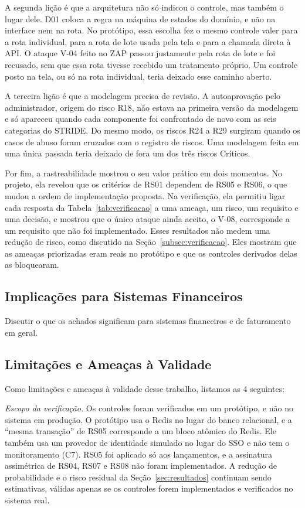 \documentclass[conference]{IEEEtran}
\begin{document}
A segunda lição é que a arquitetura não só indicou o controle, mas também o lugar dele. D01 coloca a regra na máquina de estados do domínio, e não na interface nem na rota. No protótipo, essa escolha fez o mesmo controle valer para a rota individual, para a rota de lote usada pela tela e para a chamada direta à API. O ataque V-04 feito no ZAP passou justamente pela rota de lote e foi recusado, sem que essa rota tivesse recebido um tratamento próprio. Um controle posto na tela, ou só na rota individual, teria deixado esse caminho aberto.

A terceira lição é que a modelagem precisa de revisão. A autoaprovação pelo administrador, origem do risco R18, não estava na primeira versão da modelagem e só apareceu quando cada componente foi confrontado de novo com as seis categorias do STRIDE. Do mesmo modo, os riscos R24 a R29 surgiram quando os casos de abuso foram cruzados com o registro de riscos. Uma modelagem feita em uma única passada teria deixado de fora um dos três riscos Críticos.

Por fim, a rastreabilidade mostrou o seu valor prático em dois momentos. No projeto, ela revelou que os critérios de RS01 dependem de RS05 e RS06, o que mudou a ordem de implementação proposta. Na verificação, ela permitiu ligar cada resposta da Tabela~\ref{tab:verificacao} a uma ameaça, um risco, um requisito e uma decisão, e mostrou que o único ataque ainda aceito, o V-08, corresponde a um requisito que não foi implementado. Esses resultados não medem uma redução de risco, como discutido na Seção~\ref{subsec:verificacao}. Eles mostram que as ameaças priorizadas eram reais no protótipo e que os controles derivados delas as bloquearam.

\subsection{Implicações para Sistemas Financeiros}
Discutir o que os achados significam para sistemas financeiros e de faturamento em geral.

\subsection{Limitações e Ameaças à Validade}
\label{subsec:limitacoes}

Como limitações e ameaças à validade desse trabalho, listamos as 4 seguintes:

\emph{Escopo da verificação.} Os controles foram verificados em um protótipo, e não no sistema em produção. O protótipo usa o Redis no lugar do banco relacional, e a ``mesma transação'' de RS05 corresponde a um bloco atômico do Redis. Ele também usa um provedor de identidade simulado no lugar do SSO e não tem o monitoramento (C7). RS05 foi aplicado só aos lançamentos, e a assinatura assimétrica de RS04, RS07 e RS08 não foram implementados. A redução de probabilidade e o risco residual da Seção~\ref{sec:resultados} continuam sendo estimativas, válidas apenas se os controles forem implementados e verificados no sistema real.
\end{document}
